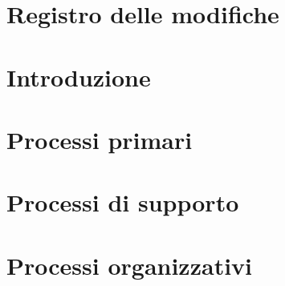 \documentclass[a4paper, oneside, openany, dvipsnames, table]{article}
\begin{document}
\copertina{} 

\section*{Registro delle modifiche}\label{sec:Registro-modifiche}


\newpage
\tableofcontents

\newpage
\listoftables

\newpage
\listoffigures

\newpage
\section{Introduzione}\label{sec:introduzione}


\newpage
\section{Processi primari}\label{sec:processi-primari}


\newpage
\section{Processi di supporto}\label{sec:processi-di-supporto}


\newpage
\section{Processi organizzativi}\label{sec:processi-organizzativi}

\end{document}

